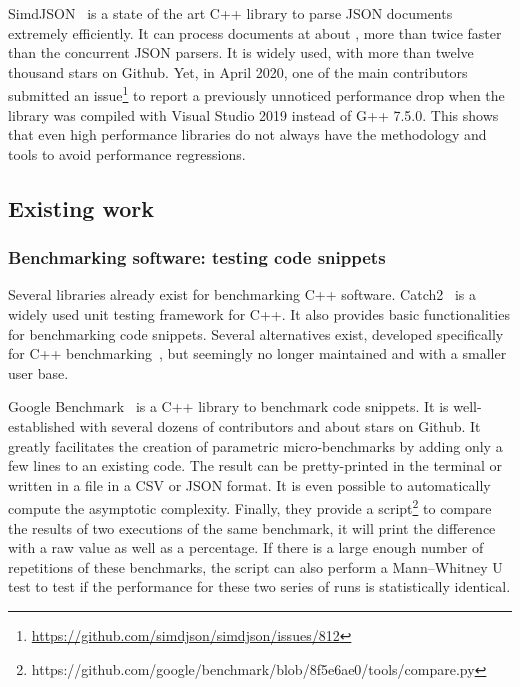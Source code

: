             SimdJSON~\cite{simdjson} is a state of the art C++ library to parse JSON documents extremely efficiently. It
            can process documents at about , more than twice faster than the concurrent
            JSON parsers. It is widely used, with more than twelve thousand stars on Github. Yet, in April 2020, one of
            the main contributors submitted an issue\footnote{\url{https://github.com/simdjson/simdjson/issues/812}} to
            report a previously unnoticed  performance drop when the library was compiled with Visual
            Studio 2019 instead of G++ 7.5.0. This shows that even high performance libraries do not always have the
            methodology and tools to avoid performance regressions.

        \subsection{Existing work}%
        \label{sub:existing_work}

            \subsubsection{Benchmarking software: testing code snippets}%

                Several libraries already exist for benchmarking C++ software. Catch2~\cite{catch2} is a widely used
                unit testing framework for C++. It also provides basic functionalities for benchmarking code snippets.
                Several alternatives exist, developed specifically for C++ benchmarking~\cite{celero,hayai,nonius}, but
                seemingly no longer maintained and with a smaller user base.

                Google Benchmark~\cite{google-benchmark} is a C++ library to benchmark code snippets. It is
                well-established with several dozens of contributors and about  stars on Github. It greatly
                facilitates the creation of parametric micro-benchmarks by adding only a few lines to an existing code.
                The result can be pretty-printed in the terminal or written in a file in a CSV or JSON format. It is
                even possible to automatically compute the asymptotic complexity. Finally, they provide a
                script\footnote{https://github.com/google/benchmark/blob/8f5e6ae0/tools/compare.py} to compare the
                results of two executions of the same benchmark, it will print the difference with a raw value as well
                as a percentage.  If there is a large enough number of repetitions of these benchmarks, the script can
                also perform a Mann–Whitney U test to test if the performance for these two series of runs is
                statistically identical.

